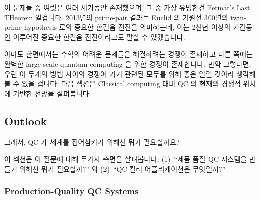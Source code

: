 이 문제들 중 여럿은 여러 세기동안 존재했으며, 그 중 가장 유명한건 Fermat's Last
THeorem 일겁니다.
2013년의 prime-pair 결과는 Euclid 의 기원전 300년의 twin-prime hypothesis 로의
중요한 한걸음 진전을 의미하는데, 이는 2천년 이상의 기간동안 이루어진 중요한
한걸음 진전이라고도 말할 수 있겠습니다.

아마도 한편에서는 수학의 어려운 문제들을 해결하려는 경쟁이 존재하고 다른 쪽에는
완벽한 large-scale quantum computing 을 위한 경쟁이 존재합니다.
만약 그렇다면, 우린 이 두개의 방법 사이의 경쟁이 거기 관련된 모두를 위해 좋은
일일 것이라 생각해 볼 수 있을 겁니다.
다음 섹션은 Classical computing 대비 QC 의 현재의 경쟁적 위치에 기반한 전망을
살펴봅니다.

\subsection{Outlook}
\label{sec:future:Outlook}

그래서, QC 가 세계를 집어삼키기 위해선 뭐가 필요할까요?

이 섹션은 이 질문에 대해 두가지 측면을 살펴봅니다:
(1)~``제품 품질 QC 시스템을 만들기 위해선 뭐가 필요할까?'' 와
(2)~``QC 킬러 어플리케이션은 무엇일까?''

\subsubsection{Production-Quality QC Systems}
\label{sec:future:Production-Quality QC Systems}

